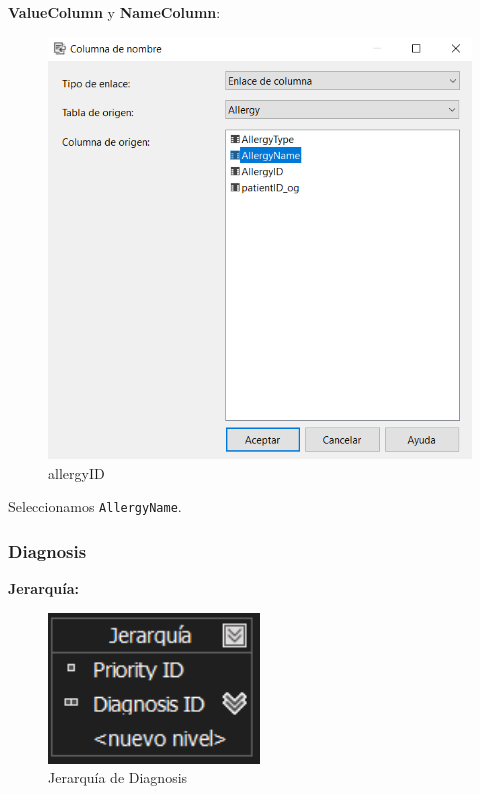 \documentclass[12pt, a4paper, twoside]{article}
\begin{document}
\textbf{ValueColumn} y \textbf{NameColumn}:

\begin{figure}[H]
	\centering
	\includegraphics[width=1\textwidth]{image/allergyID}
	\caption{allergyID}
	\label{fig:19}
\end{figure}

Seleccionamos \texttt{AllergyName}.

\subsubsection{Diagnosis}

\textbf{Jerarquía:}

\begin{figure}[H]
	\centering
	\includegraphics[width=0.5\textwidth]{image/JDiagnosis}
	\caption{Jerarquía de Diagnosis}
	\label{fig:20}
\end{figure}
\end{document}
